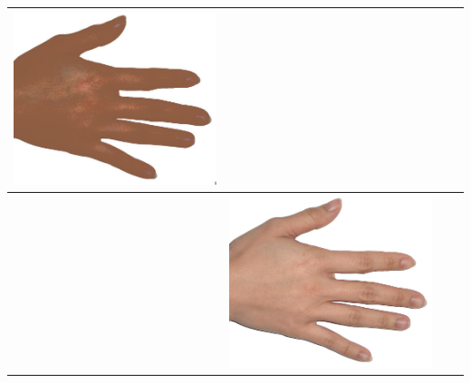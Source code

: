 \begin{longtable}{|N||c|c|c|}
\begin{minipage}{.29\textwidth}
    \includegraphics[width=\textwidth,height=\textheight,keepaspectratio]{../rc_test/outputs/20170517_proportional_corrected_test_alpha10/hand_light_to_hand_dark.jpg}
  \end{minipage} \\
\hline  \label{row:prop_correct_test_a10_hand_light_to_hand_brown} &
  \begin{minipage}{.29\textwidth}
    \includegraphics[width=\textwidth,height=\textheight,keepaspectratio]{../inputs/hand_light.jpg}

\end{minipage}
\end{longtable}
